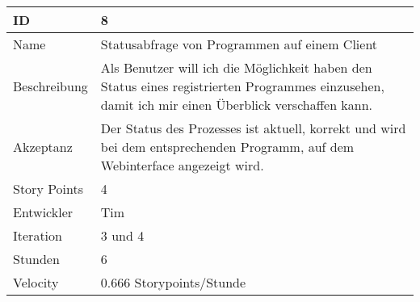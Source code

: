 \begin{table}[htbp]
\begin{minipage}{\linewidth}
\setlength{\tymax}{0.5\linewidth}
\centering
\small
\begin{tabulary}{\textwidth}{|l|p{10cm}|} \hline
 ID   &8\\\hline


Name  &Statusabfrage von Programmen auf einem Client\\\hline
Beschreibung&Als Benutzer will ich die Möglichkeit haben den Status eines registrierten Programmes einzusehen, damit ich mir einen Überblick verschaffen kann.\\\hline
Akzeptanz &Der Status des Prozesses ist aktuell, korrekt und wird bei dem entsprechenden Programm, auf dem Webinterface angezeigt wird.\\\hline
Story Points&4\\\hline
Entwickler &Tim\\\hline
Iteration &3 und 4\\\hline
Stunden  &6\\\hline
Velocity &0.666 Storypoints\slash Stunde\\\hline
\end{tabulary}
\end{minipage}
\end{table}



